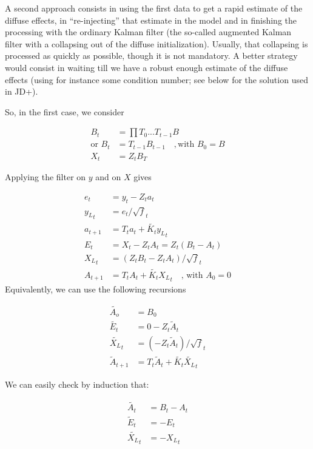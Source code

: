 \documentclass[
  letterpaper,
  DIV=11,
  numbers=noendperiod]{scrreprt}
\begin{document}
A second approach consists in using the first data to get a rapid
estimate of the diffuse effects, in ``re-injecting'' that estimate in
the model and in finishing the processing with the ordinary Kalman
filter (the so-called augmented Kalman filter with a collapsing out of
the diffuse initialization). Usually, that collapsing is processed as
quickly as possible, though it is not mandatory. A better strategy would
consist in waiting till we have a robust enough estimate of the diffuse
effects (using for instance some condition number; see below for the
solution used in JD+).

So, in the first case, we consider

\[
\begin{align*}
B_t &= \prod{T_0...T_{t-1}}B \\
\text{or } B_t &= T_{t-1}B_{t-1} \quad, \text{with } B_0=B \\
X_t &= Z_t B_T
\end{align*}
\]

Applying the filter on \(y\) and on \(X\) gives

\[
\begin{align*}
e_t &= y_t-Z_t a_t \\
{y_L}_t &= e_t / \sqrt f_t \\
a_{t+1} &= T_t a_t + \tilde{K_t} {y_L}_t \\
E_t &= X_t - Z_t A_t = Z_t (B_t - A_t) \\ 
{X_L}_t &= (Z_t B_t - Z_t A_t) / \sqrt f_t \\
A_{t+1} &= T_t A_t + \tilde{K_t} {X_L}_t \quad \text{, with }A_0 = 0 
\end{align*}
\] Equivalently, we can use the following recursions

\[
\begin{align*}
\tilde{A_o} &= B_0 \\
\tilde{E_t} &= 0 -  Z_t \tilde A_t \\
\tilde {X_L}_t &= ( - Z_t \tilde A_t) / \sqrt f_t \\
\tilde A_{t+1} &= T_t \tilde A_t + \tilde{K_t} \tilde{X_L}_t
\end{align*}
\]

We can easily check by induction that:

\[
\begin{align*}
\tilde{A_t} &= B_t - A_t \\
\tilde E_t &= - E_t \\
\tilde {X_L}_t &= - {X_L}_t
\end{align*}
\]
\end{document}
